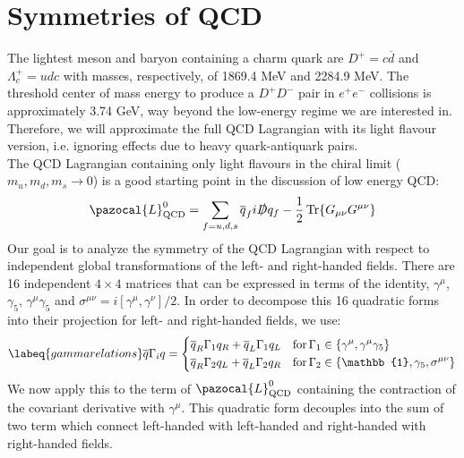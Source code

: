 \documentclass[../main.tex]{subfiles}
\begin{document}
\section{Symmetries of QCD}
The lightest meson and baryon containing a charm quark are $D^+=c\overline{d}$ and $\Lambda_c^+=udc$ with masses, respectively, of 1869.4 MeV and 2284.9 MeV. The threshold center of mass energy to produce a $D^+D^-$ pair in $e^+e^-$ collisions is approximately 3.74 GeV, way beyond the low-energy regime we are interested in. Therefore, we will approximate the full QCD Lagrangian with its light flavour version, i.e. ignoring effects due to heavy quark-antiquark pairs.\\
The QCD Lagrangian containing only light flavours in the chiral limit ($m_u,m_d,m_s\to0$) is a good starting point in the discussion of low energy QCD:
\[
\pazocal{L}_{\text{QCD}}^0=\sum_{f=u,d,s}\overline{q}_fi\slashed{D}q_f-\frac{1}{2}\Tr{G_{\mu\nu}G^{\mu\nu}}
\]
Our goal is to analyze the symmetry of the QCD Lagrangian with respect to independent global transformations of the left- and right-handed fields. There are 16 independent $4\times4$ matrices that can be expressed in terms of the identity, $\gamma^\mu$, $\gamma_5$, $\gamma^\mu\gamma_5$ and $\sigma^{\mu\nu}=i[\gamma^\mu,\gamma^\nu]/2$. In order to decompose this 16 quadratic forms into their projection for left- and right-handed fields, we use:
\begin{equation}
\labeq{gammarelations}
\overline{q}\Gamma_iq=\left\{
\begin{aligned}
&\overline{q}_R\Gamma_1q_R+\overline{q}_L\Gamma_1q_L \quad \text{for}\,\Gamma_1\in\{\gamma^\mu,\gamma^\mu\gamma_5\}\\
&\overline{q}_R\Gamma_2q_L+\overline{q}_L\Gamma_2q_R \quad \text{for}\,\Gamma_2\in\{\mathbb{1},\gamma_5,\sigma^{\mu\nu}\}
\end{aligned}
\right.
\end{equation}
We now apply this to the term of $\pazocal{L}_{\text{QCD}}^0$ containing the contraction of the covariant derivative with $\gamma^\mu$. This quadratic form decouples into the sum of two term which connect left-handed with left-handed and right-handed with right-handed fields.
\end{document}
